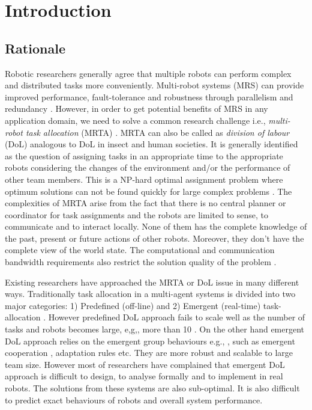 \chapter{Introduction}
\section{Rationale}
Robotic researchers generally agree that multiple robots can perform complex and distributed tasks more conveniently. Multi-robot systems (MRS) can provide improved performance, fault-tolerance and robustness through parallelism and redundancy \cite{Arkin1998,Parker+2006,Mataric2007}. However, in order to get potential benefits of MRS in any application domain, we need to solve a common research challenge i.e., \textit{multi-robot task allocation} (MRTA) \cite{Gerkey+2004}. MRTA can also be called as \textit{division of labour} (DoL) analogous to DoL in insect and human societies. It is generally identified as the question of assigning tasks in an appropriate time to the appropriate robots considering the changes of the environment and/or the performance of other team members. This is a NP-hard optimal assignment problem where optimum solutions can not be found quickly for large complex problems \cite{Gerkey+2003,Parker2008}. The complexities of MRTA arise from the fact that there is no central planner or coordinator for task assignments and the robots are limited to sense, to communicate and to interact locally. None of them has the complete knowledge of the past, present or future actions of other robots. Moreover, they don't have the complete view of the world state. The computational and communication bandwidth requirements also restrict the solution quality of the problem \cite{Lerman+2006}. 

Existing researchers have approached the MRTA or DoL issue in many different ways. Traditionally task allocation in a multi-agent systems is divided into two major categories: 1) Predefined (off-line) and 2) Emergent (real-time) task-allocation \cite{Shen+2001}. However predefined DoL approach fails to scale well as the number of tasks and robots becomes large, e,g,, more than 10 \cite{Lerman+2006}. On the other hand emergent DoL approach relies on the emergent group behaviours e.g., \cite{Kube+1993}, such as emergent cooperation \cite{Lerman+2006}, adaptation rules \cite{Liu+2007} etc. They are more robust  and scalable to large team size. However most of researchers have complained that emergent DoL approach is difficult to design, to analyse formally and to implement in real robots. The solutions from these systems are also sub-optimal. It is also difficult to predict exact behaviours of robots and overall system performance.


